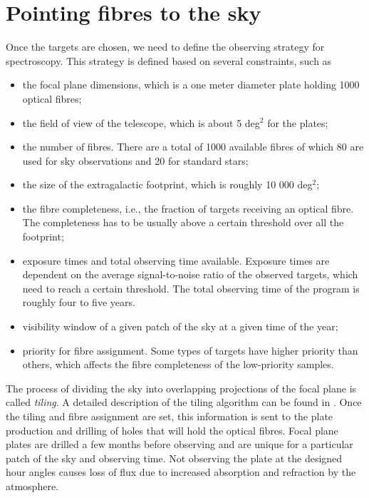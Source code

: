 \section{Pointing fibres to the sky}
\label{spectro:fibres}

Once the targets are chosen, we need to define the observing strategy
for spectroscopy. This strategy is defined based on several constraints, 
such as 
\begin{itemize}
    \item the focal plane dimensions, which is a one meter diameter plate holding 1000 optical fibres;
    \item the field of view of the telescope, which is about 5 deg$^2$ for the plates; 
    \item the number of fibres. There are a total of 1000 available fibres  of 
            which 80 are used for sky observations and 20 for standard stars; 
    \item the size of the extragalactic footprint, which is roughly 10 000 deg$^2$; 
    \item the fibre completeness, i.e., the fraction of targets receiving an 
          optical fibre. The completeness has to be usually above a certain 
          threshold over all the footprint;
    \item exposure times and total observing time available. 
        Exposure times are dependent on the average signal-to-noise ratio of 
        the observed targets, which need to reach a certain threshold. 
        The total observing time of the program is roughly four to five years. 
    \item visibility window of a given patch of the sky at a given time of the year; 
    \item priority for fibre assignment. Some types of targets have higher priority than others,
        which affects the fibre completeness of the low-priority samples.  
\end{itemize}

The process of dividing the sky into overlapping projections of the focal plane 
is called \emph{tiling}. A detailed description of the tiling algorithm can be found in 
\cite{blantonEfficientTargetingStrategy2003}. 
Once  the tiling and fibre assignment
are set, this information is sent to the plate production and drilling of holes 
that will hold the optical fibres. Focal plane plates are drilled a few months 
before observing and are unique for a particular patch of the sky and observing time. 
Not observing the plate at the designed hour angles causes loss of flux due to increased absorption and 
refraction by the atmosphere. 


